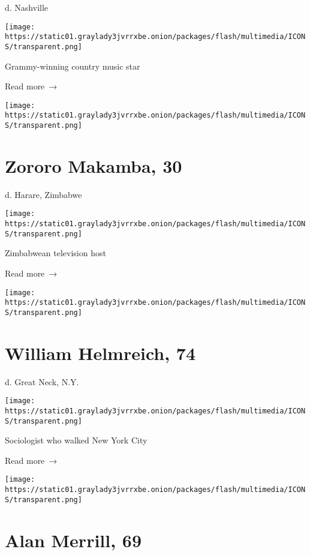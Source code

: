 d. Nashville

\texttt{[image: https://static01.graylady3jvrrxbe.onion/packages/flash/multimedia/ICONS/transparent.png]}

Grammy-winning country music star

 Read more~→

\href{https://www.nytimes3xbfgragh.onion/2020/03/30/obituaries/zororo-makamba-30-dies-zimbabwean-television-host.html}{}

\texttt{[image: https://static01.graylady3jvrrxbe.onion/packages/flash/multimedia/ICONS/transparent.png]}

\hypertarget{zororo-makamba-30}{%
\section{Zororo Makamba, 30}\label{zororo-makamba-30}}

d. Harare, Zimbabwe

\texttt{[image: https://static01.graylady3jvrrxbe.onion/packages/flash/multimedia/ICONS/transparent.png]}

Zimbabwean television host

 Read more~→

\href{https://www.nytimes3xbfgragh.onion/2020/03/30/nyregion/william-helmreich-dead-coronavirus.html}{}

\texttt{[image: https://static01.graylady3jvrrxbe.onion/packages/flash/multimedia/ICONS/transparent.png]}

\hypertarget{william-helmreich-74}{%
\section{William Helmreich, 74}\label{william-helmreich-74}}

d. Great Neck, N.Y.

\texttt{[image: https://static01.graylady3jvrrxbe.onion/packages/flash/multimedia/ICONS/transparent.png]}

Sociologist who walked New York City

 Read more~→

\href{https://www.nytimes3xbfgragh.onion/2020/03/30/arts/music/alan-merrill-dead-coronavirus.html}{}

\texttt{[image: https://static01.graylady3jvrrxbe.onion/packages/flash/multimedia/ICONS/transparent.png]}

\hypertarget{alan-merrill-69}{%
\section{Alan Merrill, 69}\label{alan-merrill-69}}

